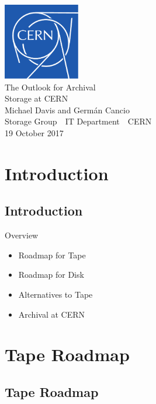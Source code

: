 \documentclass{beamer}
\begin{document}

{
\begin{frame}
\begin{center}
\vspace{-4ex}
\includegraphics[width=0.25\textwidth]{images/CERN_logo}\\[2ex]
\color{cern@dkblue}
{\Huge{} The Outlook for Archival\\[0.5ex]
Storage at CERN}\\[2ex]
{\Large Michael Davis and Germ\'{a}n Cancio}\\[2ex]
\color{cern@dkcomp}
Storage Group~\textbullet~IT Department~\textbullet~CERN\\[1ex]
19 October 2017
\end{center}
\end{frame}
}

\color{cern@dkblue}


\section{Introduction}
\subsection{Introduction}

\begin{frame}{Overview}{}
{\Large
\begin{itemize}
   \item Roadmap for Tape
   \item Roadmap for Disk
   \item Alternatives to Tape
   \item Archival at CERN 
\end{itemize}
}
\end{frame}



\section{Tape Roadmap}
\subsection{Tape Roadmap}
\end{document}

